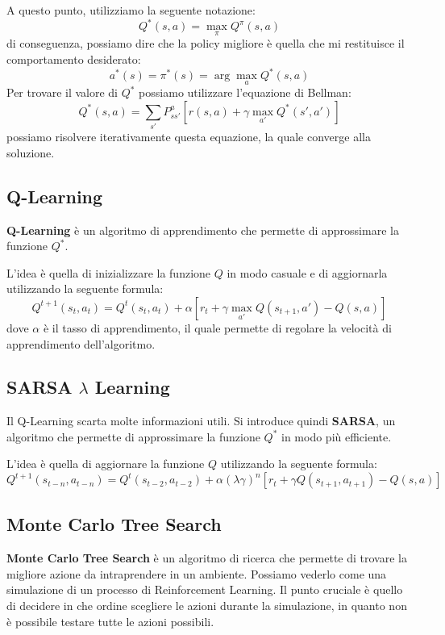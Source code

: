 A questo punto, utilizziamo la seguente notazione:
\begin{equation*}
    Q^{\ast} (s, a) = \max_{\pi} Q^{\pi}(s, a)
\end{equation*}
di conseguenza, possiamo dire che la policy migliore è quella che mi restituisce
il comportamento desiderato:
\begin{equation}
    a^{\ast}(s) = \pi^{\ast} (s) = \arg \max_{a} Q^{\ast} (s, a)
\end{equation}
Per trovare il valore di $Q^{\ast}$ possiamo utilizzare l'equazione di Bellman:
\begin{equation}
    Q^{\ast} (s, a) = \sum_{s'} P_{ss'}^{a} [r(s, a) + \gamma \max_{a'} Q^{\ast} (s', a')]
\end{equation}
possiamo risolvere iterativamente questa equazione, la quale converge alla soluzione.
\subsection{Q-Learning}
\textbf{Q-Learning} è un algoritmo di apprendimento che permette di approssimare
la funzione $Q^{\ast}$.

L'idea è quella di inizializzare la funzione $Q$ in modo casuale e di aggiornarla
utilizzando la seguente formula:
\begin{equation}
    Q^{t + 1}(s_t, a_t) = Q^{t}(s_t, a_t) + \alpha [r_t + \gamma \max_{a'}
        Q(s_{t + 1}, a') - Q(s, a)]
\end{equation}
dove $\alpha$ è il tasso di apprendimento, il quale permette di regolare la velocità
di apprendimento dell'algoritmo.
\subsection{SARSA $\lambda$ Learning}
Il Q-Learning scarta molte informazioni utili. Si introduce quindi \textbf{SARSA},
un algoritmo che permette di approssimare la funzione $Q^{\ast}$ in modo più efficiente.

L'idea è quella di aggiornare la funzione $Q$ utilizzando la seguente formula:
\begin{equation}
    Q^{t + 1}(s_{t - n}, a_{t - n}) = Q^{t}(s_{t - 2}, a_{t - 2}) +
    \alpha(\lambda \gamma)^n  [r_t + \gamma Q(s_{t + 1}, a_{t + 1}) - Q(s, a)]
\end{equation}
\subsection{Monte Carlo Tree Search}
\textbf{Monte Carlo Tree Search} è un algoritmo di ricerca che permette di trovare
la migliore azione da intraprendere in un ambiente. Possiamo vederlo come una
simulazione di un processo di Reinforcement Learning. Il punto cruciale è quello
di decidere in che ordine scegliere le azioni durante la simulazione, in quanto
non è possibile testare tutte le azioni possibili.

